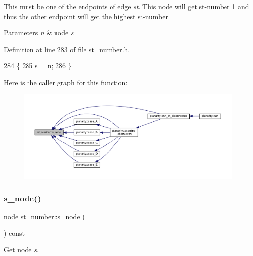 This must be one of the endpoints of edge {\itshape st}. This node will get st-\/number 1 and thus the other endpoint will get the highest st-\/number.


\begin{DoxyParams}{Parameters}
{\em n} & node {\itshape s} \\
\hline
\end{DoxyParams}


Definition at line 283 of file st\+\_\+number.\+h.


\begin{DoxyCode}
284     \{
285     \mbox{\hyperlink{classst__number_a1ada73c04f88b70b2392aa9ab0d1a6b0}{s}} = n;
286     \}
\end{DoxyCode}
Here is the caller graph for this function\+:\nopagebreak
\begin{figure}[H]
\begin{center}
\leavevmode
\includegraphics[width=350pt]{classst__number_aa607c9aaa5a4d9c45e5854ce672f0fda_icgraph}
\end{center}
\end{figure}
\mbox{\label{classst__number_aba061fba83eb63b7a23dd685e1db663c}} 
\subsubsection{\texorpdfstring{s\+\_\+node()}{s\_node()}\hspace{0.1cm}{\footnotesize\ttfamily [2/2]}}
{\footnotesize\ttfamily \mbox{\hyperlink{classnode}{node}} st\+\_\+number\+::s\+\_\+node (\begin{DoxyParamCaption}{ }\end{DoxyParamCaption}) const\hspace{0.3cm}{\ttfamily [inline]}}



Get node {\itshape s}. 


